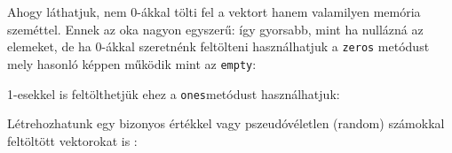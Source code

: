 \begin{python}

\end{python}

\begin{python}

\end{python}

\begin{python}

\end{python}

\begin{python}

\end{python}

\begin{python}

\end{python}

\begin{python}

\end{python}


    Ahogy láthatjuk, nem 0-ákkal tölti fel a vektort hanem valamilyen
memória szeméttel. Ennek az oka nagyon egyszerű: így gyorsabb, mint ha
nullázná az elemeket, de ha 0-ákkal szeretnénk feltölteni használhatjuk
a \texttt{zeros} metódust mely hasonló képpen működik mint az
\texttt{empty}:

\begin{python}

\end{python}

\begin{python}

\end{python}

    1-esekkel is feltölthetjük ehez a \texttt{ones}metódust használhatjuk:

\begin{python}

\end{python}

\begin{python}

\end{python}

    Létrehozhatunk egy bizonyos értékkel vagy pszeudóvéletlen (random)
számokkal feltöltött vektorokat is :

\begin{python}

\end{python}

